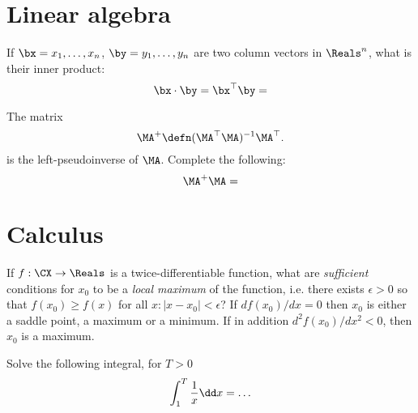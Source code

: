 \documentclass[a4paper]{article}
\begin{document}
\section{Linear algebra}

\begin{exercise}
  If $\bx = x_1, \ldots, x_n$, $\by = y_1, \ldots, y_n$ are two column vectors in $\Reals^n$, what is their inner product:
  \[
  \bx \cdot \by = \bx^\top \by = 
  \ifdefined \solution
  \sum_{i=1}^n x_i y_i
  \fi
  \]
\end{exercise}

\begin{exercise}
  The matrix 
  \[
  \MA^+ \defn (\MA^\top \MA)^{-1} \MA^\top.
  \]
  is the left-pseudoinverse of $\MA$. Complete the following:
  \[
  \MA^+ \MA =
  \ifdefined \solution
  (\MA^\top \MA)^{-1} \MA^\top \MA
  = 
  \eye
  \fi
  \]
\end{exercise}


\section{Calculus}

\begin{exercise}
  If $f : \CX \to \Reals$ is a twice-differentiable function, what are \emph{sufficient} conditions for $x_0$ to be a \emph{local maximum} of the function, i.e. there exists $\epsilon > 0$ so that $f(x_0) \geq f(x)$ for all $x : |x - x_0| < \epsilon$?
  \ifdefined\solution
  If $d f(x_0) /dx  = 0$ then
  $x_0$ is either a saddle point, a maximum or a minimum. If in addition $d^2 f(x_0) /dx^2 < 0$, then $x_0$ is a maximum.
  \fi
\end{exercise}

\begin{exercise}
  Solve the following integral, for $T > 0$
  \[
  \int_{1}^T \frac{1}{x} \dd x =
  \ifdefined\solution
  \ln T
  \else 
  \ldots
  \fi
  \]
\end{exercise}
\end{document}
